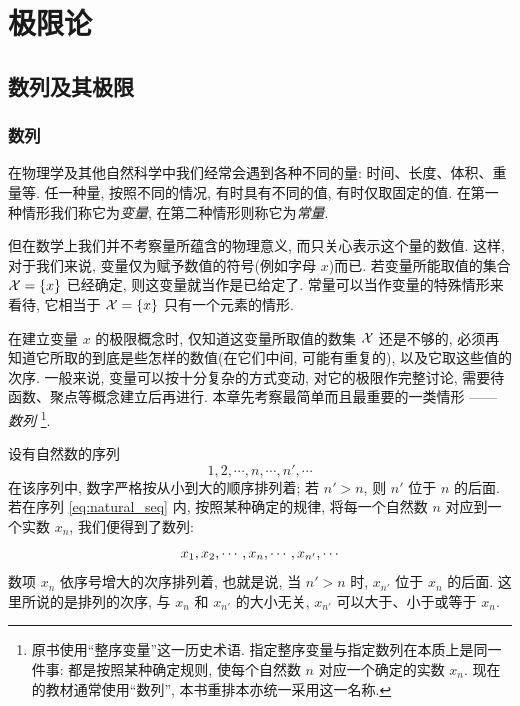 \chapter{极限论}

\section{数列及其极限}\label{sec:sequence_limits}


\subsection{数列}\label{subsec:22}
在物理学及其他自然科学中我们经常会遇到各种不同的量:
时间、长度、体积、重量等.
任一种量, 按照不同的情况, 有时具有不同的值, 有时仅取固定的值.
在第一种情形我们称它为\emph{变量},
在第二种情形则称它为\emph{常量}.

但在数学上我们并不考察量所蕴含的物理意义, 而只关心表示这个量的数值.
这样, 对于我们来说, 变量仅为赋予数值的符号(例如字母 $x$)而已.
若变量所能取值的集合 $\mathcal{X} = \{ x\}$ 已经确定, 则这变量就当作是已给定了.
常量可以当作变量的特殊情形来看待, 它相当于 $\mathcal{X} = \{x\}$ 只有一个元素的情形.

在建立变量 $x$ 的极限概念时, 仅知道这变量所取值的数集 $\mathcal{X}$ 还是不够的,
必须再知道它所取的到底是些怎样的数值(在它们中间, 可能有重复的), 以及它取这些值的次序.
一般来说, 变量可以按十分复杂的方式变动, 对它的极限作完整讨论, 需要待函数、聚点等概念建立后再进行.
本章先考察最简单而且最重要的一类情形 —— \emph{数列}
\footnote{原书使用“整序变量”这一历史术语.
指定整序变量与指定数列在本质上是同一件事:
都是按照某种确定规则, 使每个自然数 $n$ 对应一个确定的实数 $x_n$.
现在的教材通常使用“数列”, 本书重排本亦统一采用这一名称.}.

设有自然数的序列
\begin{equation}\label{eq:natural_seq}
    1, 2, \cdots, n, \cdots, n', \cdots
\end{equation}
在该序列中, 数字严格按从小到大的顺序排列着; 若 $n' > n$, 则 $n'$ 位于 $n$ 的后面.
若在序列 \eqref{eq:natural_seq} 内, 按照某种确定的规律, 将每一个自然数 $n$ 对应到一个实数 $x_n$, 我们便得到了数列:
\begin{equation}
    \seq{x}, \cdots, x_{n'}, \cdots \label{eq:real_seq}
\end{equation}
数项 $x_n$ 依序号增大的次序排列着,
也就是说, 当 $n' > n$ 时, $x_{n'}$ 位于 $x_n$ 的后面.
这里所说的是排列的次序, 与 $x_n$ 和 $x_{n'}$ 的大小无关,
$x_{n'}$ 可以大于、小于或等于 $x_n$.

